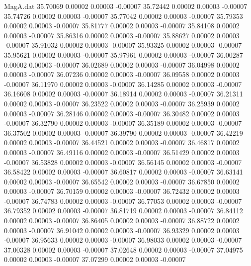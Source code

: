 \begin{filecontents}{MagA.dat}
  35.70069    0.00002    0.00003   -0.00007
  35.72442    0.00002    0.00003   -0.00007
  35.74726    0.00002    0.00003   -0.00007
  35.77042    0.00002    0.00003   -0.00007
  35.79353    0.00002    0.00003   -0.00007
  35.81777    0.00002    0.00003   -0.00007
  35.84108    0.00002    0.00003   -0.00007
  35.86316    0.00002    0.00003   -0.00007
  35.88627    0.00002    0.00003   -0.00007
  35.91032    0.00002    0.00003   -0.00007
  35.93325    0.00002    0.00003   -0.00007
  35.95621    0.00002    0.00003   -0.00007
  35.97961    0.00002    0.00003   -0.00007
  36.00287    0.00002    0.00003   -0.00007
  36.02689    0.00002    0.00003   -0.00007
  36.04998    0.00002    0.00003   -0.00007
  36.07236    0.00002    0.00003   -0.00007
  36.09558    0.00002    0.00003   -0.00007
  36.11970    0.00002    0.00003   -0.00007
  36.14285    0.00002    0.00003   -0.00007
  36.16608    0.00002    0.00003   -0.00007
  36.18914    0.00002    0.00003   -0.00007
  36.21311    0.00002    0.00003   -0.00007
  36.23522    0.00002    0.00003   -0.00007
  36.25939    0.00002    0.00003   -0.00007
  36.28146    0.00002    0.00003   -0.00007
  36.30482    0.00002    0.00003   -0.00007
  36.32790    0.00002    0.00003   -0.00007
  36.35189    0.00002    0.00003   -0.00007
  36.37502    0.00002    0.00003   -0.00007
  36.39790    0.00002    0.00003   -0.00007
  36.42219    0.00002    0.00003   -0.00007
  36.44521    0.00002    0.00003   -0.00007
  36.46817    0.00002    0.00003   -0.00007
  36.49116    0.00002    0.00003   -0.00007
  36.51429    0.00002    0.00003   -0.00007
  36.53828    0.00002    0.00003   -0.00007
  36.56145    0.00002    0.00003   -0.00007
  36.58422    0.00002    0.00003   -0.00007
  36.60817    0.00002    0.00003   -0.00007
  36.63141    0.00002    0.00003   -0.00007
  36.65542    0.00002    0.00003   -0.00007
  36.67850    0.00002    0.00003   -0.00007
  36.70159    0.00002    0.00003   -0.00007
  36.72432    0.00002    0.00003   -0.00007
  36.74783    0.00002    0.00003   -0.00007
  36.77053    0.00002    0.00003   -0.00007
  36.79352    0.00002    0.00003   -0.00007
  36.81719    0.00002    0.00003   -0.00007
  36.84112    0.00002    0.00003   -0.00007
  36.86405    0.00002    0.00003   -0.00007
  36.88722    0.00002    0.00003   -0.00007
  36.91042    0.00002    0.00003   -0.00007
  36.93329    0.00002    0.00003   -0.00007
  36.95633    0.00002    0.00003   -0.00007
  36.98033    0.00002    0.00003   -0.00007
  37.00328    0.00002    0.00003   -0.00007
  37.02648    0.00002    0.00003   -0.00007
  37.04975    0.00002    0.00003   -0.00007
  37.07299    0.00002    0.00003   -0.00007

\end{filecontents}

